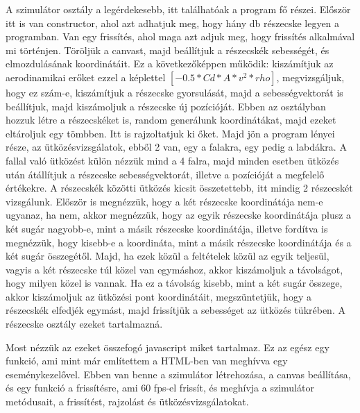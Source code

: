 A szimulátor osztály a legérdekesebb, itt találhatóak a program fő részei. Először itt is van constructor, ahol azt adhatjuk meg, hogy hány db részecske legyen a programban. Van egy frissítés, ahol maga azt adjuk meg, hogy frissítés alkalmával mi történjen. Töröljük a canvast, majd beállítjuk a részecskék sebességét, és elmozdulásának koordinátáit. Ez a következőképpen működik: kiszámítjuk az aerodinamikai erőket ezzel a képlettel $[-0.5 * Cd * A * v^2 * rho]$, megvizsgáljuk, hogy ez szám-e, kiszámítjuk a részecske gyorsulását, majd a sebességvektorát is beállítjuk, majd kiszámoljuk a részecske új pozícióját. Ebben az osztályban hozzuk létre a részecskéket is, random generálunk koordinátákat, majd ezeket eltároljuk egy tömbben. Itt is rajzoltatjuk ki őket. Majd jön a program lényei része, az ütközésvizsgálatok, ebből 2 van, egy a falakra, egy pedig a labdákra. A fallal való ütközést külön nézzük mind a 4 falra, majd minden esetben ütközés után átállítjuk a részecske sebességvektorát, illetve a pozícióját a megfelelő értékekre. A részecskék  közötti ütközés kicsit összetettebb, itt mindig 2 részecskét vizsgálunk. Először is megnézzük, hogy a két részecske koordinátája nem-e ugyanaz, ha nem, akkor megnézzük, hogy az egyik részecske koordinátája plusz a két sugár nagyobb-e, mint a másik részecske koordinátája, illetve fordítva is megnézzük, hogy kisebb-e a koordináta, mint a másik részecske koordinátája és a két sugár összegétől. Majd, ha ezek közül a feltételek közül az egyik teljesül, vagyis a két részecske túl közel van egymáshoz, akkor kiszámoljuk a távolságot, hogy milyen közel is vannak. Ha ez a távolság kisebb, mint a két sugár összege, akkor kiszámoljuk az ütközési pont koordinátáit, megszüntetjük, hogy a részecskék elfedjék egymást, majd frissítjük a sebességet az ütközés tükrében. A részecske osztály ezeket tartalmazná. 


Most nézzük az ezeket összefogó javascript miket tartalmaz. Ez az egész egy funkció, ami mint már említettem a HTML-ben van meghívva egy eseménykezelővel. Ebben van benne a szimulátor létrehozása, a canvas beállítása, és egy funkció a frissítésre, ami 60 fps-el frissít, és meghívja a szimulátor metódusait, a frissítést, rajzolást és ütközésvizsgálatokat.  

